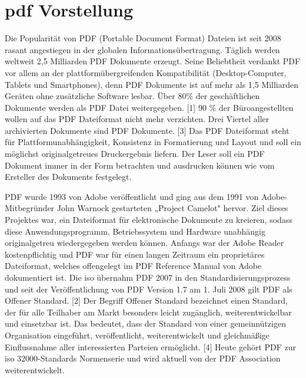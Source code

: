 \section{\gls{pdf} Vorstellung}
Die Popularität von PDF (Portable Document Format) Dateien ist seit 2008 rasant angestiegen in der globalen Informationsübertragung. Täglich werden weltweit 2,5 Milliarden PDF Dokumente erzeugt. Seine Beliebtheit verdankt PDF vor allem an der plattformübergreifenden Kompatibilität (Desktop-Computer, Tablets und Smartphones), denn PDF Dokumente ist auf mehr als 1,5 Milliarden Geräten ohne zusätzliche Software lesbar. Über 80\% der geschäftlichen Dokumente werden als PDF Datei weitergegeben. [1] 90 \% der Büroangestellten wollen auf das PDF Dateiformat nicht mehr verzichten. Drei Viertel aller archivierten Dokumente sind PDF Dokumente. [3] Das PDF Dateiformat steht für Plattformunabhängigkeit, Konsistenz in Formatierung und Layout und soll ein möglichst originalgetreues Druckergebnis liefern. Der Leser soll ein PDF Dokument immer in der Form betrachten und ausdrucken können wie vom Ersteller des Dokuments festgelegt.
\par
PDF wurde 1993 von Adobe veröffentlicht und ging aus dem 1991 von Adobe-Mitbegründer John Warnock gestarteten „Project Camelot" hervor. Ziel dieses Projektes war, ein Dateiformat für elektronische Dokumente zu kreieren, sodass diese Anwendungsprogramm, Betriebssystem und Hardware unabhängig originalgetreu wiedergegeben werden können. Anfangs war der Adobe Reader kostenpflichtig und PDF war für einen langen Zeitraum ein proprietäres Dateiformat, welches offengelegt im PDF Reference Manual von Adobe dokumentiert ist. Die \gls{iso} übernahm PDF 2007 in den Standardisierungsprozess und seit der Veröffentlichung von PDF Version 1.7 am 1. Juli 2008 gilt PDF als Offener Standard. [2] Der Begriff Offener Standard bezeichnet einen Standard, der für alle Teilhaber am Markt besonders leicht zugänglich, weiterentwickelbar und einsetzbar ist. Das bedeutet, dass der Standard von einer gemeinnützigen Organisation eingeführt, veröffentlicht, weiterentwickelt und gleichmäßige Einflussnahme aller interessierten Parteien ermöglicht. [4] Heute gehört PDF zur \gls{iso} 32000-Standards Normenserie und wird aktuell von der PDF Association weiterentwickelt.
